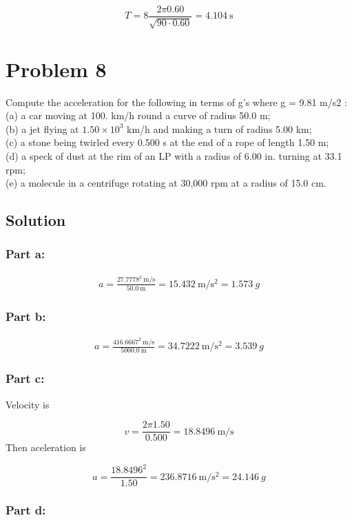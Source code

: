 \documentclass{article}
\begin{document}
\[
	T = 8 \frac{2 \pi 0.60}{\sqrt{90 \cdot 0.60}} = \boxed{4.104\ \text{s}}
\]


\section*{Problem 8}
Compute the acceleration for the following in terms of g's where g = 9.81 m/s2 :\\ (a) a car
moving at 100. km/h round a curve of radius 50.0 m;\\ (b) a jet flying at $1.50\times10^3$ km/h and
making a turn of radius 5.00 km;\\ (c) a stone being twirled every 0.500 s at the end of a rope of
length 1.50 m;\\ (d) a speck of dust at the rim of an LP with a radius of 6.00 in. turning at 33.1
rpm;\\ (e) a molecule in a centrifuge rotating at 30,000 rpm at a radius of 15.0 cm.

\subsection*{Solution}
\subsubsection*{Part a:}
\begin{align*}
	a = \frac{27.7778^2\ \text{m/s}}{50.0\ \text{m}} =  15.432\ \text{m}/\text{s}^2 = \boxed{1.573\ g}
\end{align*}

\subsubsection*{Part b:}
\begin{align*}
	a = \frac{416.6667^2\ \text{m/s}}{5000.0\ \text{m}} =  34.7222\ \text{m}/\text{s}^2 = \boxed{3.539\ g}
\end{align*}

\subsubsection*{Part c:}
Velocity is

\[
	v = \frac{2 \pi 1.50}{0.500} = 18.8496\ \text{m}/\text{s}
\]
Then aceleration is

\[
	a = \frac{18.8496^2}{1.50} = 236.8716\ \text{m}/\text{s}^2 = \boxed{24.146\ g}
\]

\subsubsection*{Part d:}
\[

\]
\end{document}
